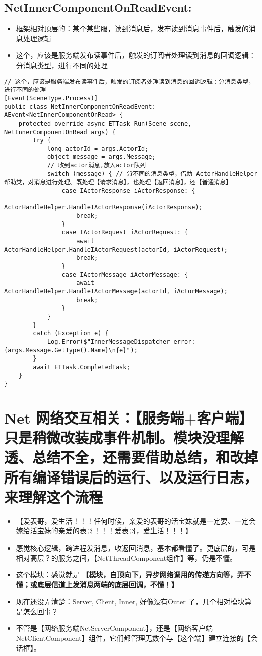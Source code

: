 \documentclass[9pt, b5paper]{article}
\begin{document}
\subsection{NetInnerComponentOnReadEvent:}
\label{sec-2-19}
\begin{itemize}
\item 框架相对顶层的：某个某些服，读到消息后，发布读到消息事件后，触发的消息处理逻辑
\item 这个，应该是服务端发布读事件后，触发的订阅者处理读到消息的回调逻辑：分消息类型，进行不同的处理
\end{itemize}
\begin{verbatim}
// 这个，应该是服务端发布读事件后，触发的订阅者处理读到消息的回调逻辑：分消息类型，进行不同的处理
[Event(SceneType.Process)]
public class NetInnerComponentOnReadEvent: AEvent<NetInnerComponentOnRead> {
    protected override async ETTask Run(Scene scene, NetInnerComponentOnRead args) {
        try {
            long actorId = args.ActorId;
            object message = args.Message;
            // 收到actor消息,放入actor队列
            switch (message) { // 分不同的消息类型，借助 ActorHandleHelper 帮助类，对消息进行处理。既处理【请求消息】，也处理【返回消息】，还【普通消息】
                case IActorResponse iActorResponse: {
                    ActorHandleHelper.HandleIActorResponse(iActorResponse);
                    break;
                }
                case IActorRequest iActorRequest: {
                    await ActorHandleHelper.HandleIActorRequest(actorId, iActorRequest);
                    break;
                }
                case IActorMessage iActorMessage: {
                    await ActorHandleHelper.HandleIActorMessage(actorId, iActorMessage);
                    break;
                }
            }
        }
        catch (Exception e) {
            Log.Error($"InnerMessageDispatcher error: {args.Message.GetType().Name}\n{e}");
        }
        await ETTask.CompletedTask;
    }
}
\end{verbatim}

\section{Net 网络交互相关：【服务端+客户端】只是稍微改装成事件机制。模块没理解透、总结不全，还需要借助总结，和改掉所有编译错误后的运行、以及运行日志，来理解这个流程}
\label{sec-3}
\begin{itemize}
\item 【爱表哥，爱生活！！！任何时候，亲爱的表哥的活宝妹就是一定要、一定会嫁给活宝妹的亲爱的表哥！！！爱表哥，爱生活！！！】
\item 感觉核心逻辑，跨进程发消息，收返回消息，基本都看懂了。更底层的，可是相对高层？的服务之间，【NetThreadComponent组件】等，仍是不懂。
\item 这个模块：感觉就是 \textbf{【模块，自顶向下，异步网络调用的传递方向等，弄不懂；或底层信道上发消息两端的底层回调，不懂！】}
\item 现在还没弄清楚：Server, Client, Inner, 好像没有Outer 了，几个相对模块算是怎么回事？
\item 不管是【网络服务端NetServerComponent】，还是【网络客户端 NetClientComponent】组件，它们都管理无数个与【这个端】建立连接的【会话框】。
\end{itemize}
\end{document}
